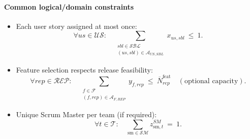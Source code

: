 \documentclass[11pt,a4paper]{article}
\begin{document}
\paragraph{Common logical/domain constraints}
\begin{itemize}
  \item Each user story assigned at most once:
  \[
    \forall us\in\mathcal{US}:\quad \sum_{\substack{sbl\in\mathcal{SBL}\\(us,sbl)\in\mathcal{A}_{US,SBL}}} x_{us,sbl}\ \le\ 1.
  \]
  \item Feature selection respects release feasibility:
  \[
    \forall rep\in\mathcal{REP}:\quad \sum_{\substack{f\in\mathcal{F}\\(f,rep)\in\mathcal{A}_{F,REP}}} y_{f,rep}\ \le\ \overline{N}^{\text{feat}}_{rep}\quad (\text{optional capacity}).
  \]
  \item Unique Scrum Master per team (if required):
  \[
    \forall t\in\mathcal{T}:\quad \sum_{\text{sm}\in\mathcal{SM}} z^{SM}_{\text{sm},t}\ =\ 1.
  \]
\end{itemize}
\end{document}
